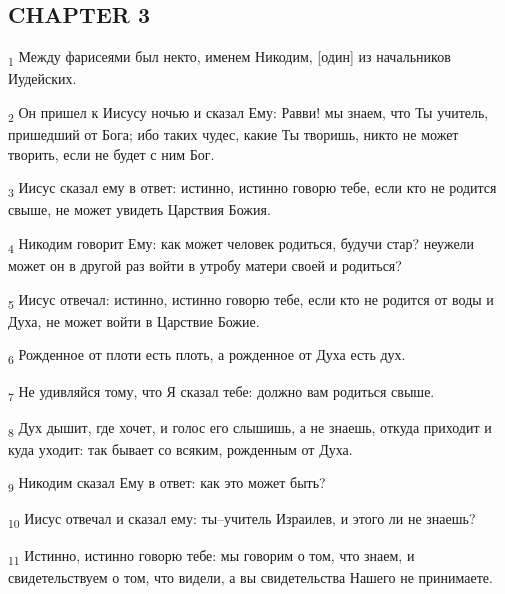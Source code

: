 \subsection{CHAPTER 3}
\begin{tcolorbox}
\textsubscript{1} Между фарисеями был некто, именем Никодим, [один] из начальников Иудейских.
\end{tcolorbox}
\begin{tcolorbox}
\textsubscript{2} Он пришел к Иисусу ночью и сказал Ему: Равви! мы знаем, что Ты учитель, пришедший от Бога; ибо таких чудес, какие Ты творишь, никто не может творить, если не будет с ним Бог.
\end{tcolorbox}
\begin{tcolorbox}
\textsubscript{3} Иисус сказал ему в ответ: истинно, истинно говорю тебе, если кто не родится свыше, не может увидеть Царствия Божия.
\end{tcolorbox}
\begin{tcolorbox}
\textsubscript{4} Никодим говорит Ему: как может человек родиться, будучи стар? неужели может он в другой раз войти в утробу матери своей и родиться?
\end{tcolorbox}
\begin{tcolorbox}
\textsubscript{5} Иисус отвечал: истинно, истинно говорю тебе, если кто не родится от воды и Духа, не может войти в Царствие Божие.
\end{tcolorbox}
\begin{tcolorbox}
\textsubscript{6} Рожденное от плоти есть плоть, а рожденное от Духа есть дух.
\end{tcolorbox}
\begin{tcolorbox}
\textsubscript{7} Не удивляйся тому, что Я сказал тебе: должно вам родиться свыше.
\end{tcolorbox}
\begin{tcolorbox}
\textsubscript{8} Дух дышит, где хочет, и голос его слышишь, а не знаешь, откуда приходит и куда уходит: так бывает со всяким, рожденным от Духа.
\end{tcolorbox}
\begin{tcolorbox}
\textsubscript{9} Никодим сказал Ему в ответ: как это может быть?
\end{tcolorbox}
\begin{tcolorbox}
\textsubscript{10} Иисус отвечал и сказал ему: ты--учитель Израилев, и этого ли не знаешь?
\end{tcolorbox}
\begin{tcolorbox}
\textsubscript{11} Истинно, истинно говорю тебе: мы говорим о том, что знаем, и свидетельствуем о том, что видели, а вы свидетельства Нашего не принимаете.
\end{tcolorbox}

